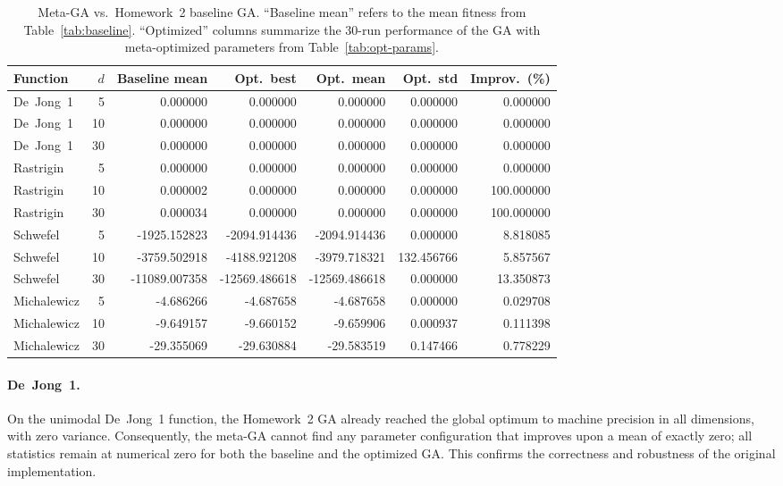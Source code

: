 \documentclass[11pt]{article}
\begin{document}
\begin{table}[t]
  \centering
  \small
  \caption{Meta-GA vs. Homework~2 baseline GA.
  ``Baseline mean'' refers to the mean fitness from Table~\ref{tab:baseline}.
  ``Optimized'' columns summarize the 30-run performance of the GA with
  meta-optimized parameters from Table~\ref{tab:opt-params}.}
  \label{tab:comparison}
  \begin{tabular}{lrrrrrr}
    \toprule
    Function & $d$ &
    Baseline mean &
    Opt.\ best &
    Opt.\ mean &
    Opt.\ std &
    Improv. (\%) \\
    \midrule
    De~Jong~1 & 5  &  0.000000 &  0.000000 & 0.000000 & 0.000000 &   0.000000 \\ 
    De~Jong~1 & 10 &  0.000000 &  0.000000 & 0.000000 & 0.000000 &   0.000000 \\ 
    De~Jong~1 & 30 &  0.000000 &  0.000000 & 0.000000 & 0.000000 &   0.000000 \\ 
    \midrule
    Rastrigin & 5  &  0.000000 &  0.000000 & 0.000000 & 0.000000 &   0.000000 \\ 
    Rastrigin & 10 &  0.000002 &  0.000000 & 0.000000 & 0.000000 & 100.000000 \\ 
    Rastrigin & 30 &  0.000034 &  0.000000 & 0.000000 & 0.000000 & 100.000000 \\ 
    \midrule
    Schwefel & 5  & -1925.152823 & -2094.914436 & -2094.914436 & 0.000000 &  8.818085 \\ 
    Schwefel & 10 & -3759.502918 & -4188.921208 & -3979.718321 & 132.456766 &  5.857567 \\ 
    Schwefel & 30 & -11089.007358& -12569.486618& -12569.486618& 0.000000 & 13.350873 \\ 
    \midrule
    Michalewicz & 5  & -4.686266 & -4.687658 & -4.687658 & 0.000000 & 0.029708 \\ 
    Michalewicz & 10 & -9.649157 & -9.660152 & -9.659906 & 0.000937 & 0.111398 \\ 
    Michalewicz & 30 & -29.355069& -29.630884& -29.583519& 0.147466 & 0.778229 \\ 
    \bottomrule
  \end{tabular}
\end{table}

\paragraph{De~Jong~1.}
On the unimodal De~Jong~1 function, the Homework~2 GA already reached the
global optimum to machine precision in all dimensions, with zero variance.
Consequently, the meta-GA cannot find any parameter configuration that
improves upon a mean of exactly zero; all statistics remain at numerical zero
for both the baseline and the optimized GA.
This confirms the correctness and robustness of the original implementation.
\end{document}
